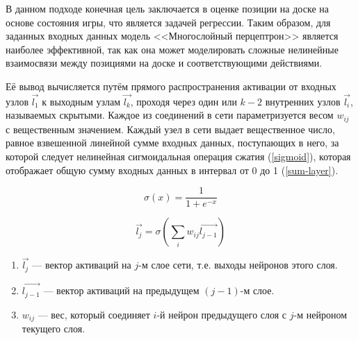 В данном подходе конечная цель заключается в оценке позиции на доске на основе состояния игры, что является задачей регрессии. Таким образом, для заданных входных данных модель <<Многослойный перцептрон>> \cite{mlp} является наиболее эффективной, так как она может моделировать сложные нелинейные взаимосвязи между позициями на доске и соответствующими действиями.

Её вывод вычисляется путём прямого распространения активации от входных узлов $\vec{l_1}$ к выходным узлам $\vec{l_k}$, проходя через один или $k - 2$ внутренних узлов $\vec{l_i}$, называемых скрытыми. Каждое из соединений в сети параметризуется весом $w_{ij}$ с вещественным значением. Каждый узел в сети выдает вещественное число, равное взвешенной линейной сумме входных данных, поступающих в него, за которой следует нелинейная сигмоидальная операция сжатия (\ref{sigmoid}), которая отображает общую сумму входных данных в интервал от 0 до 1 (\ref{sum-layer}).

\begin{equation}\label{sigmoid}
    \sigma(x) = \frac{1}{1 + e^{-x}}
\end{equation}

\begin{equation}\label{sum-layer}
    \vec{l_j}= \sigma \left(\sum_i w_{ij} \vec{l_{j-1}} \right)
\end{equation}

\begin{enumerate}
    \item $\vec{l_j}$ --- вектор активаций на $j$-м слое сети, т.е. выходы нейронов этого слоя.
    \item $\vec{l_{j-1}}$ --- вектор активаций на предыдущем $(j-1)$-м слое.
    \item $w_{ij}$ --- вес, который соединяет $i$-й нейрон предыдущего слоя с $j$-м нейроном текущего слоя.
\end{enumerate}

